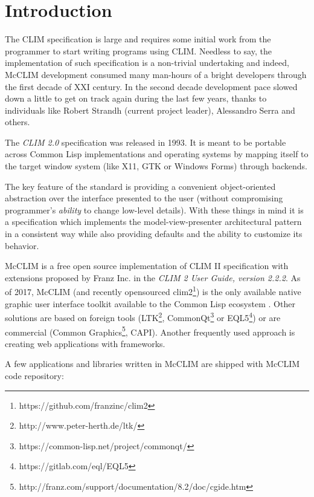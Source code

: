 \documentclass{sig-alternate-05-2015}
\begin{document}

\section{Introduction}

The CLIM specification\cite{CLIM2} is large and requires some initial
work from the programmer to start writing programs using
CLIM. Needless to say, the implementation of such specification is a
non-trivial undertaking and indeed, McCLIM development consumed many
man-hours of a bright developers through the first decade of XXI
century. In the second decade development pace slowed down a little to
get on track again during the last few years, thanks to individuals
like Robert Strandh (current project leader), Alessandro Serra and
others.

The \emph{CLIM 2.0} specification was released in 1993. It is meant to
be portable across Common Lisp\cite{ansi:common:lisp} implementations
and operating systems by mapping itself to the target window system
(like X11\cite{Scheifler:1986:XWS:22949.24053},
GTK\cite{Pennington:1999:GAD:554548} or Windows
Forms\cite{Sells:2006:WFP:1146336}) through backends.

The key feature of the standard is providing a convenient
object-oriented abstraction over the interface presented to the user
(without compromising programmer's \emph{ability} to change low-level
details). With these things in mind it is a specification which
implements the model-view-presenter architectural pattern in a
consistent way while also providing defaults and the ability to
customize its behavior.

McCLIM is a free open source implementation of CLIM II specification
with extensions proposed by Franz Inc. in the \emph{CLIM 2 User Guide,
  version 2.2.2}.  As of 2017, McCLIM (and recently opensourced
clim2\footnote{https://github.com/franzinc/clim2}) is the only
available native graphic user interface toolkit available to the
Common Lisp ecosystem . Other solutions are based on foreign tools
(LTK\footnote{http://www.peter-herth.de/ltk/},
CommonQt\footnote{https://common-lisp.net/project/commonqt/} or
EQL5\footnote{https://gitlab.com/eql/EQL5}) or are commercial (Common
Graphics\footnote{http://franz.com/support/documentation/8.2/doc/cgide.htm},
CAPI\cite{http://www.lispworks.com/products/capi.html}). Another
frequently used approach is creating web applications with frameworks.

A few applications and libraries written in McCLIM are shipped with
McCLIM code repository:
\end{document}
